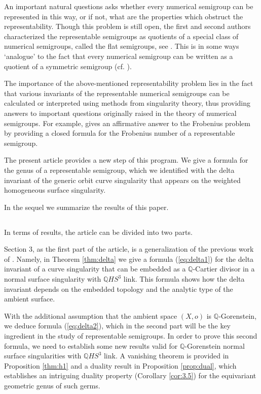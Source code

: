 \documentclass[12pt,a4paper]{amsart}
\theoremstyle{remark}
\theoremstyle{definition}
\begin{document}
An important natural questions asks 
whether every  numerical semigroup can be represented in this way, or if not, what 
are the properties which obstruct the representability. 
Though this problem is still open,  the first and second authors characterized the representable semigroups as quotients of a special class of numerical semigroups, called the flat semigroups, see \cite{flat}. This is in some ways `analogue' to the fact that every numerical semigroup can be written as a quotient of a symmetric semigroup (cf. \cite{RGS,S}).  

The importance of the above-mentioned representability problem lies in the fact that various invariants of the representable numerical semigroups can be calculated or interpreted using methods from singularity theory,
thus providing answers to important questions originally  raised in the theory of numerical semigroups. 
For example, \cite{stronglyflat} gives an affirmative answer to the Frobenius problem by providing a closed formula for the Frobenius number of a representable semigroup.

The  present article provides a new step of this program.
We give a formula for the genus of a representable semigroup, which we identified with  the delta invariant of the generic orbit curve singularity that appears on the weighted homogeneous surface singularity. 

In the sequel we  summarize the results of this paper.

\subsection{}
In terms of results, the article can be divided into two parts. 

Section 3, as the first part of the article, is a generalization of the previous work of \cite{delta1,delta2}. Namely, in Theorem \ref{thm:delta} we give a formula (\ref{eq:delta1}) for the delta invariant of a curve singularity that can be embedded as a $\mathbb{Q}$-Cartier divisor in a normal surface singularity with $\mathbb{Q}HS^3$ link. This formula shows how the delta invariant depends on the embedded topology and the analytic type of the ambient surface. 

With the additional assumption that the ambient space  $(X,o)$ is $\mathbb{Q}$-Gorenstein,
we deduce formula (\ref{eq:delta2}), which in the second part 
will be the key ingredient in the study of representable semigroups.
In order to prove this second  formula, we need to establish some new  results 
valid for  $\mathbb{Q}$-Gorenstein normal surface singularities with $\mathbb{Q}HS^3$ link. A vanishing theorem is provided in Proposition \ref{thm:h1} and a duality result in Proposition \ref{prop:dual}, which establishes an intriguing duality property (Corollary \ref{cor:3.5}) for the equivariant geometric genus of such germs. 
\end{document}
